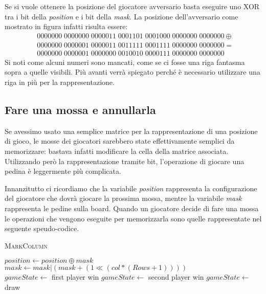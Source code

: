 \documentclass[a4paper]{article}
\begin{document}
Se si vuole ottenere la posizione del giocatore avversario basta eseguire uno
XOR tra i bit della \emph{position} e i bit della \emph{mask}. La posizione
dell'avversario come mostrato in figura infatti risulta essere:
\begin{align*}
  &0000000\; 0000000\; 0000011\; 0001101\; 0001000\; 0000000\; 0000000 \oplus\\
  &0000000\; 0000001\; 0000011\; 0011111\; 0001111\; 0000000\; 0000000 = \;\\
  &0000000\; 0000001\; 0000000\; 0010010\; 0000111\; 0000000\; 0000000\;
\end{align*}
Si noti come alcuni numeri sono mancati, come se ci fosse una riga fantasma 
sopra a quelle visibili. Più avanti verrà spiegato perché è necessario 
utilizzare una riga in più per la rappresentazione.


\subsection{Fare una mossa e annullarla}
Se avessimo usato una semplice matrice per la rappresentazione di una posizione
di gioco, le mosse dei giocatori sarebbero state effettivamente semplici da
memorizzare: bastava infatti modificare la cella della matrice associata. 
Utilizzando però la rappresentazione tramite bit, l'operazione di giocare una
pedina è leggermente più complicata. 

Innanzitutto ci ricordiamo che la variabile \emph{position} rappresenta la 
configurazione del giocatore che dovrà giocare la prossima mossa, mentre la 
variabile \emph{mask} rappresenta le pedine sulla board. Quando un giocatore
decide di fare una mossa le operazioni che vengono eseguite per memorizzarla
sono quelle rappresentate nel seguente speudo-codice.

\begin{algorithm}
  \caption{\textsc{MarkColumn}}
  \begin{algorithmic}
      \State $position \gets position \oplus mask$
      \State $mask \gets mask | (mask + (1 \ll (col * (Rows + 1))))$
      \\
          \State $gameState \gets $ first player win
        \Else
          \State $gameState \gets $ second player win 
        \EndIf
          \State $gameState \gets $ draw
      \EndIf
    \EndFunction
  \end{algorithmic}
\end{algorithm}
\end{document}
